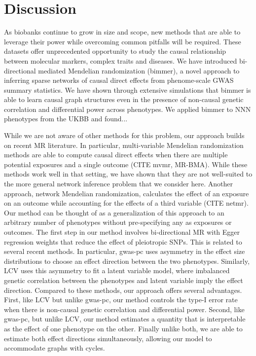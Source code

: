 \documentclass{article}
\begin{document}
\section{Discussion}\label{discussion}
As biobanks continue to grow in size and scope, new methods that are able to
leverage their power while overcoming common pitfalls will be required.
These datasets offer unprecedented opportunity to study
the causal relationship between molecular markers, complex traits and diseases.
We have introduced bi-directional mediated Mendelian randomization (bimmer),
a novel approach to inferring sparse networks of causal direct effects from phenome-scale
GWAS summary statistics. We have shown through extensive simulations that
bimmer is able to learn causal graph structures even in the presence of non-causal genetic
correlation and differential power across phenotypes. We applied bimmer to 
NNN phenotypes from the UKBB and found...


While we are not aware of other methods for this problem, our approach
builds on recent MR literature. In particular, multi-variable Mendelian
randomization methods are able to compute causal direct effects when there
are multiple potential exposures and a single outcome (CITE mvmr, MR-BMA). While
these methods work well in that setting, we have shown that they are not well-suited
to the more general network inference problem that we consider here. Another approach, network
Mendelian randomization, calculates the effect of an exposure on an outcome while
accounting for the effects of a third variable (CITE netmr). Our method can
be thought of as a generalization of this approach to an arbitrary number of phenotypes
without pre-specifying any as exposures or outcomes. The first step in our method
involves bi-directional MR with Egger regression weights that reduce the effect
of pleiotropic SNPs. This is related to several recent methods.
In particular, gwas-pc uses asymmetry in the effect size distributions
to choose an effect direction between the two phenotypes. Similarly, 
LCV uses this asymmetry to fit a latent variable model, where imbalanced
genetic correlation between the phenotypes and latent variable imply
the effect direction. Compared to these methods, our approach offers several
advantages. First, like LCV but unlike gwas-pc, our method controls the type-I error rate
when there is non-causal genetic correlation and differential power. Second, like gwas-pc,
but unlike LCV, our method estimates a quantity that is interpretable as the
effect of one phenotype on the other. Finally unlike both,
we are able to estimate both effect directions simultaneously, allowing our
model to accommodate graphs with cycles.
\end{document}
